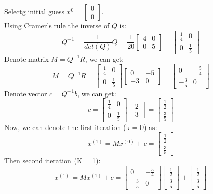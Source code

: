 \documentclass{article}
\begin{document}
Selectg initial guess \( x^{0} = \begin{bmatrix} 0 \\ 0 \end{bmatrix} \).
\\
Using Cramer's rule the inverse of $Q$ is:
\[ Q^{-1} = \frac{1}{det(Q)} Q = \frac{1}{20} \begin{bmatrix} 4 & 0 \\ 0 & 5 \end{bmatrix} = \begin{bmatrix} \frac{1}{4} & 0 \\ 0 & \frac{1}{5} \end{bmatrix} \]
Denote matrix \( M = Q^{-1}R \), we can get:
\[ M = Q^{-1}R = \begin{bmatrix} \frac{1}{4} & 0 \\ 0 & \frac{1}{5} \end{bmatrix} \begin{bmatrix} 0 & -5 \\ -3 & 0 \end{bmatrix} = \begin{bmatrix} 0 & -\frac{5}{4} \\ -\frac{3}{5} & 0 \end{bmatrix} \]
Denote vector \( c = Q^{-1}b \), we can get:
\[ c = \begin{bmatrix} \frac{1}{4} & 0 \\ 0 & \frac{1}{5} \end{bmatrix} \begin{bmatrix} 2 \\ 3 \end{bmatrix} = \begin{bmatrix} \frac{1}{2} \\ \frac{3}{5} \end{bmatrix} \]
Now, we can denote the first iteration (k = 0) as:
\[ x^{(1)} = Mx^{(0)} + c = \begin{bmatrix} \frac{1}{2} \\ \frac{3}{5} \end{bmatrix} \]
Then second iteration (K = 1):
\[ x^{(1)} = Mx^{(1)} + c = \begin{bmatrix} 0 & -\frac{5}{4} \\ -\frac{3}{5} & 0 \end{bmatrix} \begin{bmatrix} \frac{1}{2} \\ \frac{3}{5} \end{bmatrix} + \begin{bmatrix} \frac{1}{2} \\ \frac{3}{5} \end{bmatrix} \]
\end{document}

